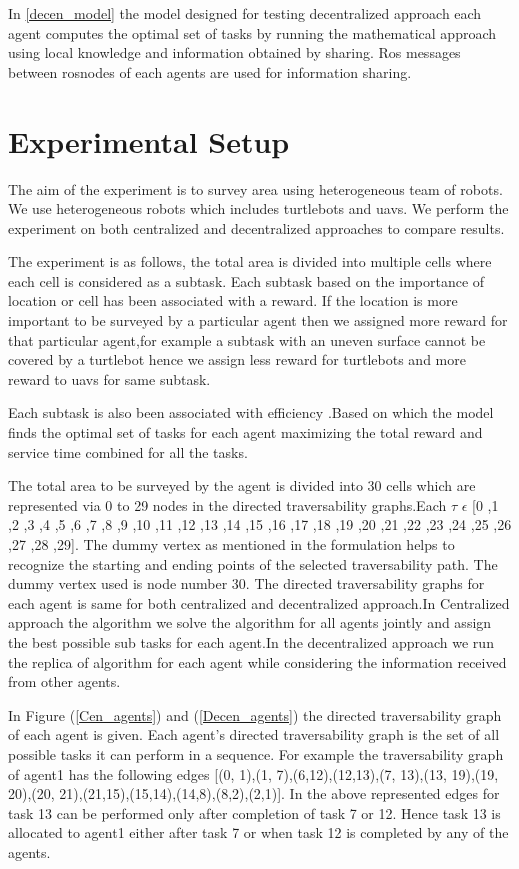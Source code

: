 \documentclass[conference]{IEEEtran}
\begin{document}
{In \ref{decen_model} the model designed for testing decentralized approach each agent computes the optimal set of tasks by running the mathematical approach using local knowledge and information obtained by sharing. Ros messages between rosnodes of each agents are used for information sharing.
\section{Experimental Setup}

The aim of the experiment is to survey area using heterogeneous team of robots. We use heterogeneous robots which includes turtlebots and uavs. We perform the experiment on both centralized and decentralized approaches to compare results.

The experiment is as follows, the total area is divided into multiple cells where each cell is considered as a subtask. Each subtask based on the importance of location or cell has been associated with a reward. If the location is more important to be surveyed by a particular agent then we assigned more reward for that particular agent,for example a subtask with an uneven surface cannot be covered by a turtlebot hence we assign less reward for turtlebots and more reward to uavs for same subtask\cite{flushing2014mathematical}.

Each subtask is also been associated with efficiency .Based on which the model finds the optimal set of tasks for each agent maximizing the total reward and service time combined for all the tasks.

The total area to be surveyed by the agent is divided into 30 cells which are represented via 0 to 29 nodes in the directed traversability graphs.Each \(\tau\) \( \epsilon \) [0 ,1 ,2 ,3 ,4 ,5 ,6 ,7 ,8 ,9 ,10 ,11 ,12 ,13 ,14 ,15 ,16 ,17 ,18 ,19 ,20 ,21 ,22 ,23 ,24 ,25 ,26 ,27 ,28 ,29].
The dummy vertex as mentioned in the formulation helps to recognize the starting and ending points of the selected traversability path. The dummy vertex used is node number 30.
The directed traversability graphs for each agent is same for both centralized and decentralized approach.In Centralized approach the algorithm we solve the algorithm for all agents jointly and assign the best possible sub tasks for each agent.In the decentralized approach we run the replica of algorithm for each agent while considering the information received from other agents.


In Figure (\ref{Cen_agents}) and (\ref{Decen_agents}) the directed traversability graph of each agent is given. Each agent's directed traversability graph is the set of all possible tasks it can perform in a sequence. For example the traversability graph of agent1 has the following edges [(0, 1),(1, 7),(6,12),(12,13),(7, 13),(13, 19),(19, 20),(20, 21),(21,15),(15,14),(14,8),(8,2),(2,1)]. In the above represented edges for task 13 can be performed only after completion of task 7 or 12. Hence task 13 is allocated to agent1 either after task 7 or when task 12 is completed by any of the agents.

}
\end{document}
